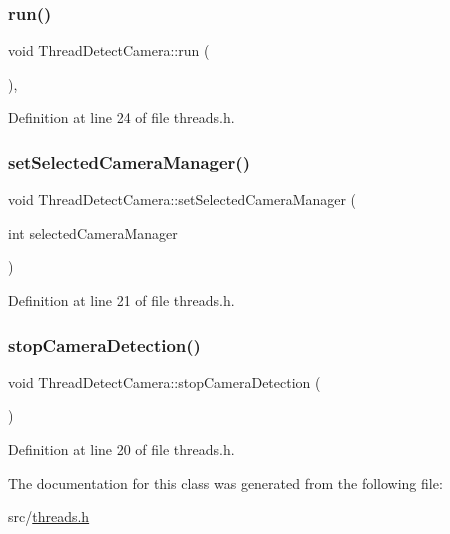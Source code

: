 \mbox{\label{class_thread_detect_camera_aa33878a7044810c947e2fb3a6b36db44}} 
\subsubsection{\texorpdfstring{run()}{run()}}
{\footnotesize\ttfamily void Thread\+Detect\+Camera\+::run (\begin{DoxyParamCaption}{ }\end{DoxyParamCaption})\hspace{0.3cm}{\ttfamily [inline]}, {\ttfamily [protected]}}



Definition at line 24 of file threads.\+h.

\mbox{\label{class_thread_detect_camera_a801682460d0afc47ce56d9433bf29b19}} 
\subsubsection{\texorpdfstring{setSelectedCameraManager()}{setSelectedCameraManager()}}
{\footnotesize\ttfamily void Thread\+Detect\+Camera\+::set\+Selected\+Camera\+Manager (\begin{DoxyParamCaption}\item[{int}]{selected\+Camera\+Manager }\end{DoxyParamCaption})\hspace{0.3cm}{\ttfamily [inline]}}



Definition at line 21 of file threads.\+h.

\mbox{\label{class_thread_detect_camera_a842bc6740ec072adf240e17d77b185de}} 
\subsubsection{\texorpdfstring{stopCameraDetection()}{stopCameraDetection()}}
{\footnotesize\ttfamily void Thread\+Detect\+Camera\+::stop\+Camera\+Detection (\begin{DoxyParamCaption}{ }\end{DoxyParamCaption})\hspace{0.3cm}{\ttfamily [inline]}}



Definition at line 20 of file threads.\+h.



The documentation for this class was generated from the following file\+:\begin{DoxyCompactItemize}
\item 
src/\mbox{\hyperlink{threads_8h}{threads.\+h}}\end{DoxyCompactItemize}
